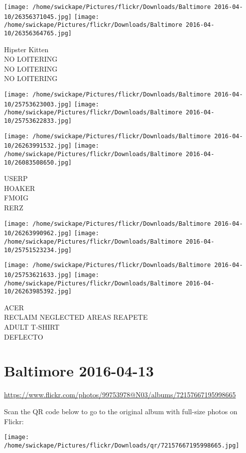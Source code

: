 \documentclass[10pt,letterpaper]{article}
\begin{document}
\texttt{[image: /home/swickape/Pictures/flickr/Downloads/Baltimore 2016-04-10/26356371045.jpg]}
\texttt{[image: /home/swickape/Pictures/flickr/Downloads/Baltimore 2016-04-10/26356364765.jpg]}

Hipster Kitten\\
NO LOITERING\\
NO LOITERING\\
NO LOITERING
\pagebreak

\texttt{[image: /home/swickape/Pictures/flickr/Downloads/Baltimore 2016-04-10/25753623003.jpg]}
\texttt{[image: /home/swickape/Pictures/flickr/Downloads/Baltimore 2016-04-10/25753622833.jpg]}

\texttt{[image: /home/swickape/Pictures/flickr/Downloads/Baltimore 2016-04-10/26263991532.jpg]}
\texttt{[image: /home/swickape/Pictures/flickr/Downloads/Baltimore 2016-04-10/26083508650.jpg]}

USERP\\
HOAKER\\
FMOIG\\
RERZ
\pagebreak

\texttt{[image: /home/swickape/Pictures/flickr/Downloads/Baltimore 2016-04-10/26263990962.jpg]}
\texttt{[image: /home/swickape/Pictures/flickr/Downloads/Baltimore 2016-04-10/25751523234.jpg]}

\texttt{[image: /home/swickape/Pictures/flickr/Downloads/Baltimore 2016-04-10/25753621633.jpg]}
\texttt{[image: /home/swickape/Pictures/flickr/Downloads/Baltimore 2016-04-10/26263985392.jpg]}

ACER\\
RECLAIM NEGLECTED AREAS REAPETE\\
ADULT T{-}SHIRT\\
DEFLECTO
\pagebreak

\section*{Baltimore 2016-04-13}

\url{https://www.flickr.com/photos/99753978@N03/albums/72157667195998665}

Scan the QR code below to go to the original album with full-size photos on Flickr:

\texttt{[image: /home/swickape/Pictures/flickr/Downloads/qr/72157667195998665.jpg]}
\pagebreak
\end{document}
